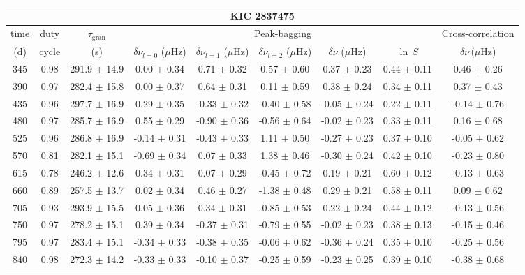 \documentclass[twocolumn]{aastex61}%
\begin{document}
\begin{table*}[ht]\centering\fontsize{9.}{7.}\selectfont
\begin{tabular}{ccc|ccccc|c}
\multicolumn{9}{c}{KIC 2837475}\\ \hline\hline
time & duty & $\tau_\text{gran}$ &\multicolumn{5}{c|}{Peak-bagging}&Cross-correlation\\
(d)& cycle & (s)&$\delta\nu_{l=0}$ ($\mu$Hz) & $\delta\nu_{l=1}$ ($\mu$Hz) & $\delta\nu_{l=2}$ ($\mu$Hz) & $\delta\nu$ ($\mu$Hz)& $\ln\,S$ & $\delta\nu\,(\mu$Hz)\\\hline
345 & 0.98 & 291.9 $\pm$ 14.9 & 0.00 $\pm$ 0.34 & 0.71 $\pm$ 0.32 & 0.57 $\pm$ 0.60 & 0.37 $\pm$ 0.23 & 0.44 $\pm$ 0.11 & 0.46 $\pm$ 0.26\\
390 & 0.97 & 282.4 $\pm$ 15.8 & 0.00 $\pm$ 0.37 & 0.64 $\pm$ 0.31 & 0.11 $\pm$ 0.59 & 0.38 $\pm$ 0.24 & 0.34 $\pm$ 0.11 & 0.37 $\pm$ 0.43\\
435 & 0.96 & 297.7 $\pm$ 16.9 & 0.29 $\pm$ 0.35 & -0.33 $\pm$ 0.32 & -0.40 $\pm$ 0.58 & -0.05 $\pm$ 0.24 & 0.22 $\pm$ 0.11 & -0.14 $\pm$ 0.76\\
480 & 0.97 & 285.7 $\pm$ 16.9 & 0.55 $\pm$ 0.29 & -0.90 $\pm$ 0.36 & -0.56 $\pm$ 0.64 & -0.02 $\pm$ 0.23 & 0.33 $\pm$ 0.11 & 0.16 $\pm$ 0.68\\
525 & 0.96 & 286.8 $\pm$ 16.9 & -0.14 $\pm$ 0.31 & -0.43 $\pm$ 0.33 & 1.11 $\pm$ 0.50 & -0.27 $\pm$ 0.23 & 0.37 $\pm$ 0.10 & -0.05 $\pm$ 0.62\\
570 & 0.81 & 282.1 $\pm$ 15.1 & -0.69 $\pm$ 0.34 & 0.07 $\pm$ 0.33 & 1.38 $\pm$ 0.46 & -0.30 $\pm$ 0.24 & 0.42 $\pm$ 0.10 & -0.23 $\pm$ 0.80\\
615 & 0.78 & 246.2 $\pm$ 12.6 & 0.34 $\pm$ 0.31 & 0.07 $\pm$ 0.29 & -0.45 $\pm$ 0.72 & 0.19 $\pm$ 0.21 & 0.60 $\pm$ 0.12 & -0.13 $\pm$ 0.63\\
660 & 0.89 & 257.5 $\pm$ 13.7 & 0.02 $\pm$ 0.34 & 0.46 $\pm$ 0.27 & -1.38 $\pm$ 0.48 & 0.29 $\pm$ 0.21 & 0.58 $\pm$ 0.11 & 0.09 $\pm$ 0.62\\
705 & 0.93 & 293.9 $\pm$ 15.5 & 0.05 $\pm$ 0.36 & 0.34 $\pm$ 0.31 & -0.85 $\pm$ 0.53 & 0.22 $\pm$ 0.24 & 0.44 $\pm$ 0.12 & -0.13 $\pm$ 0.56\\
750 & 0.97 & 278.2 $\pm$ 15.1 & 0.39 $\pm$ 0.34 & -0.37 $\pm$ 0.31 & -0.79 $\pm$ 0.55 & -0.02 $\pm$ 0.23 & 0.38 $\pm$ 0.13 & -0.15 $\pm$ 0.46\\
795 & 0.97 & 283.4 $\pm$ 15.1 & -0.34 $\pm$ 0.33 & -0.38 $\pm$ 0.35 & -0.06 $\pm$ 0.62 & -0.36 $\pm$ 0.24 & 0.35 $\pm$ 0.10 & -0.25 $\pm$ 0.56\\
840 & 0.98 & 272.3 $\pm$ 14.2 & -0.33 $\pm$ 0.33 & -0.10 $\pm$ 0.37 & -0.25 $\pm$ 0.59 & -0.23 $\pm$ 0.25 & 0.39 $\pm$ 0.10 & -0.38 $\pm$ 0.68\\

\end{tabular}
\end{table*}
\end{document}
